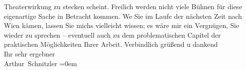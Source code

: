 \begin{ledgroupsized}[t]{13cm}
                    Theaterwirkung zu stecken scheint. Freilich werden nicht viele Bühnen für diese
                    eigenartige Sache in Betracht kommen. We{\geminationn} Sie im
                    Laufe der nächsten Zeit nach Wien kämen, lassen
                    Sie michs vielleicht wissen; es wäre mir ein Vergnügen, Sie wieder zu sprechen –
                    eventuell auch zu dem problematischen Capitel der praktischen Möglichkeiten
                    Ihrer Arbeit.\pend
           \pstart
           Verbindlich grüßend u dankend{\\[\baselineskip]}Ihr sehr ergebner{\\[\baselineskip]}\spacefill\mbox{Arthur Schnitzler}\pend
           \leftskip=0em{}
         
         \endnumbering{}\end{ledgroupsized}  \newcommand{\dateiname}{L02208}\newcommand{\titel}{Arthur Schnitzler an Robert Adam, 18. 6. 1915}\newcommand{\editorInnen}{Martin Anton Müller und Gerd-Hermann Susen}
      